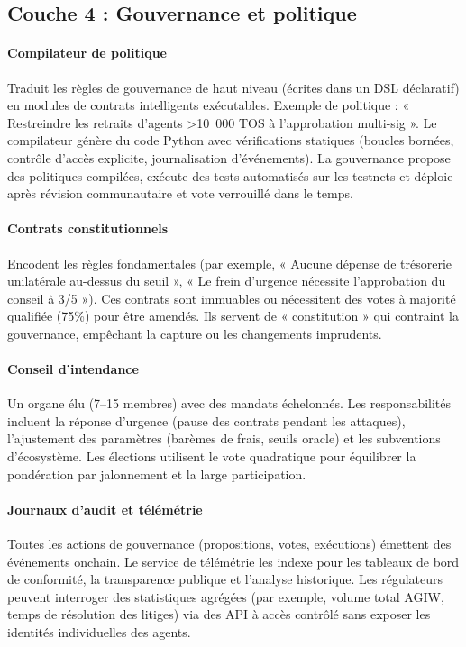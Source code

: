 \documentclass[11pt]{article}
\begin{document}
\subsection{Couche 4 : Gouvernance et politique}
\paragraph{Compilateur de politique} Traduit les règles de gouvernance de haut niveau (écrites dans un DSL déclaratif) en modules de contrats intelligents exécutables. Exemple de politique : « Restreindre les retraits d'agents >10~000 TOS à l'approbation multi-sig ». Le compilateur génère du code Python avec vérifications statiques (boucles bornées, contrôle d'accès explicite, journalisation d'événements). La gouvernance propose des politiques compilées, exécute des tests automatisés sur les testnets et déploie après révision communautaire et vote verrouillé dans le temps.

\paragraph{Contrats constitutionnels} Encodent les règles fondamentales (par exemple, « Aucune dépense de trésorerie unilatérale au-dessus du seuil », « Le frein d'urgence nécessite l'approbation du conseil à 3/5 »). Ces contrats sont immuables ou nécessitent des votes à majorité qualifiée (75\%) pour être amendés. Ils servent de « constitution » qui contraint la gouvernance, empêchant la capture ou les changements imprudents.

\paragraph{Conseil d'intendance} Un organe élu (7--15 membres) avec des mandats échelonnés. Les responsabilités incluent la réponse d'urgence (pause des contrats pendant les attaques), l'ajustement des paramètres (barèmes de frais, seuils oracle) et les subventions d'écosystème. Les élections utilisent le vote quadratique pour équilibrer la pondération par jalonnement et la large participation.

\paragraph{Journaux d'audit et télémétrie} Toutes les actions de gouvernance (propositions, votes, exécutions) émettent des événements onchain. Le service de télémétrie les indexe pour les tableaux de bord de conformité, la transparence publique et l'analyse historique. Les régulateurs peuvent interroger des statistiques agrégées (par exemple, volume total AGIW, temps de résolution des litiges) via des API à accès contrôlé sans exposer les identités individuelles des agents.
\end{document}
